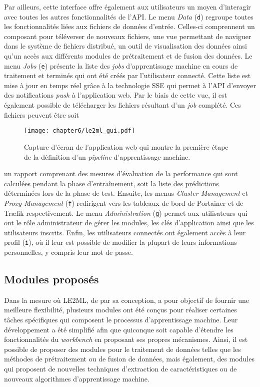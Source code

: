 Par ailleurs, cette interface offre également aux utilisateurs un moyen d'interagir avec toutes les autres fonctionnalités de l'\acs{API}. Le menu \textit{Data} (\texttt{d}) regroupe toutes les fonctionnalités liées aux fichiers de données d'entrée. Celles-ci comprennent un composant pour téléverser de nouveaux fichiers, une vue permettant de naviguer dans le système de fichiers distribué, un outil de visualisation des données ainsi qu'un accès aux différents modules de prétraitement et de fusion des données. Le menu \textit{Jobs} (\texttt{e}) présente la liste des \textit{jobs} d'apprentissage machine en cours de traitement et terminés qui ont été créés par l'utilisateur connecté. Cette liste est mise à jour en temps réel grâce à la technologie \ac{SSE} qui permet à l'\acs{API} d'envoyer des notifications \textit{push} à l'application web. Par le biais de cette vue, il est également possible de télécharger les fichiers résultant d'un \textit{job} complété. Ces fichiers peuvent être soit

\begin{figure}[H]
	\centering
	\texttt{[image: chapter6/le2ml\_gui.pdf]}
        \caption{Capture d'écran de l'application web qui montre la première étape de la définition d'un \textit{pipeline} d'apprentissage machine.}
	\label{fig:le2ml_gui}
\end{figure}

\noindent un rapport comprenant des mesures d'évaluation de la performance qui sont calculées pendant la phase d'entraînement, soit la liste des prédictions déterminées lors de la phase de test. Ensuite, les menus \textit{Cluster Management} et \textit{Proxy Management} (\texttt{f}) redirigent vers les tableaux de bord de Portainer et de Tr\ae{}fik respectivement. Le menu \textit{Administration} (\texttt{g}) permet aux utilisateurs qui ont le rôle administrateur de gérer les modules, les clés d'application ainsi que les utilisateurs inscrits. Enfin, les utilisateurs connectés ont également accès à leur profil (\texttt{i}), où il leur est possible de modifier la plupart de leurs informations personnelles, y compris leur mot de passe.

\subsection{Modules proposés}

Dans la mesure où \acs{LE2ML}, de par sa conception, a pour objectif de fournir une meilleure flexibilité, plusieurs modules ont été conçus pour réaliser certaines tâches spécifiques qui composent le processus d'apprentissage machine. Leur développement a été simplifié afin que quiconque soit capable d'étendre les fonctionnalités du \textit{workbench} en proposant ses propres mécanismes. Ainsi, il est possible de proposer des modules pour le traitement de données telles que les méthodes de prétraitement ou de fusion de données, mais également, des modules qui proposent de nouvelles techniques d'extraction de caractéristiques ou de nouveaux algorithmes d'apprentissage machine.

